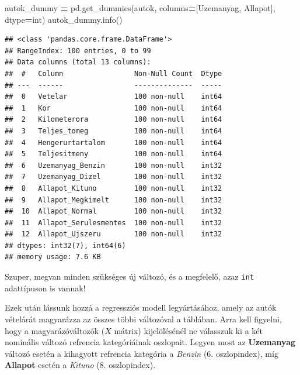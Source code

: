 \documentclass[
]{book}
\newenvironment{Shaded}{\begin{snugshade}}{\end{snugshade}}
\newcommand{\BuiltInTok}[1]{#1}
\newcommand{\NormalTok}[1]{#1}
\newcommand{\OperatorTok}[1]{\textcolor[rgb]{0.81,0.36,0.00}{\textbf{#1}}}
\newcommand{\StringTok}[1]{\textcolor[rgb]{0.31,0.60,0.02}{#1}}
\begin{document}
\begin{Shaded}
\begin{Highlighting}[]
\NormalTok{autok\_dummy }\OperatorTok{=}\NormalTok{ pd.get\_dummies(autok, columns}\OperatorTok{=}\NormalTok{[}\StringTok{\textquotesingle{}Uzemanyag\textquotesingle{}}\NormalTok{, }\StringTok{\textquotesingle{}Allapot\textquotesingle{}}\NormalTok{], dtype}\OperatorTok{=}\BuiltInTok{int}\NormalTok{)}
\NormalTok{autok\_dummy.info()}
\end{Highlighting}
\end{Shaded}

\begin{verbatim}
## <class 'pandas.core.frame.DataFrame'>
## RangeIndex: 100 entries, 0 to 99
## Data columns (total 13 columns):
##  #   Column                 Non-Null Count  Dtype
## ---  ------                 --------------  -----
##  0   Vetelar                100 non-null    int64
##  1   Kor                    100 non-null    int64
##  2   Kilometerora           100 non-null    int64
##  3   Teljes_tomeg           100 non-null    int64
##  4   Hengerurtartalom       100 non-null    int64
##  5   Teljesitmeny           100 non-null    int64
##  6   Uzemanyag_Benzin       100 non-null    int32
##  7   Uzemanyag_Dizel        100 non-null    int32
##  8   Allapot_Kituno         100 non-null    int32
##  9   Allapot_Megkimelt      100 non-null    int32
##  10  Allapot_Normal         100 non-null    int32
##  11  Allapot_Serulesmentes  100 non-null    int32
##  12  Allapot_Ujszeru        100 non-null    int32
## dtypes: int32(7), int64(6)
## memory usage: 7.6 KB
\end{verbatim}

Szuper, megvan minden szükséges új változó, és a megfelelő, azaz \texttt{int} adattípuson is vannak!

Ezek után lássunk hozzá a regressziós modell legyártásához, amely az autók vételárát magyarázza az összes többi változóval a táblában. Arra kell figyelni, hogy a magyarázóváltozók (\(X\) mátrix) kijelölésénél ne válasszuk ki a két nominális változó refrencia kategóriáinak oszlopait. Legyen most az \textbf{Uzemanyag} változó esetén a kihagyott refrencia kategória a \emph{Benzin} (6. oszlopindex), míg \textbf{Allapot} esetén a \emph{Kituno} (8. oszlopindex).
\end{document}
